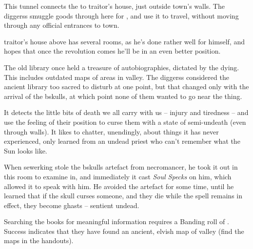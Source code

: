 \begin{multicols}{2}

This tunnel connects the  to \gls{traitor}'s house, just outside \gls{town}'s walls.
The \glspl{diggers} smuggle goods through here for , and use it to travel, without moving through any official entrances to \gls{town}.

\Gls{traitor}'s house above has several rooms, as he's done rather well for himself, and hopes that once the revolution comes he'll be in an even better position.


\begin{exampletext}
  The old library once held a treasure of autobiographies, dictated by the dying.
  This includes outdated maps of areas in \gls{valley}.
  The \glspl{diggers} considered the ancient library too sacred to disturb at one point, but that changed only with the arrival of the \gls{bskulls}, at which point none of them wanted to go near the thing.

  It detects the little bits of death we all carry with us -- injury and tiredness -- and use the feeling of their position to curse them with a state of semi-undeath (even through walls).
  It likes to chatter, unendingly, about things it has never experienced, only learned from an undead priest who can't remember what the Sun looks like.

  When \gls{sewerking} stole the \gls{bskulls} \gls{artefact} from \gls{necromancer}, he took it out in this room to examine in, and immediately it cast \textit{Soul Specks} on him, which allowed it to speak with him.
  He avoided the \gls{artefact} for some time, until he learned that if the skull curses someone, and they die while the spell remains in effect, they become ghasts -- sentient undead.%

\end{exampletext}

Searching the books for meaningful information requires a Banding roll of .
Success indicates that they have found an ancient, elvish map of \gls{valley}
(find the maps in the handouts).


\end{multicols}
